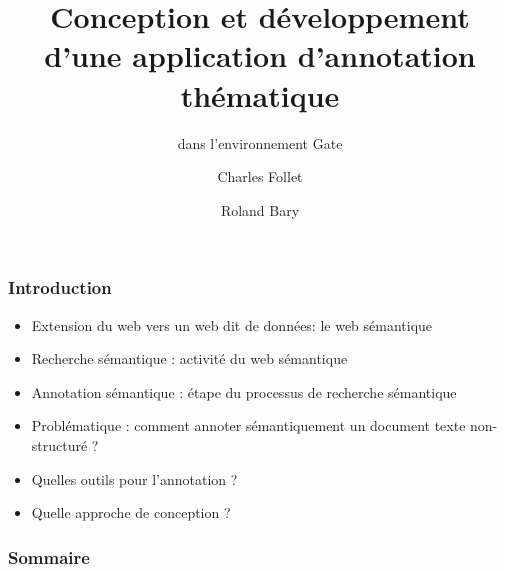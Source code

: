 \documentclass[10pt, compress]{beamer}
\title{Conception et développement d’une application d’annotation thématique}
\subtitle{dans l’environnement Gate}
\date{}
\author{Charles Follet \and Roland Bary}
\institute{Université de Pau et Pays de l'Adour}
\begin{document}
\maketitle
\begin{frame}[fragile]
	\frametitle{Introduction}
		\begin{itemize}[<+->]
  			[square]
  			\item{Extension du web vers un web dit de données: le web sémantique}
  			\item{Recherche sémantique : activité du web sémantique}
  			\item{Annotation sémantique : étape du processus de recherche sémantique}
  			\item{Problématique : comment annoter sémantiquement un document texte non-structuré ?}
  			\item{Quelles outils pour l'annotation ?}
  			\item{Quelle approche de conception ?}
  		\end{itemize}
\end{frame}

\begin{frame}[fragile]
  \frametitle{Sommaire}
  \tableofcontents
\end{frame}
\end{document}
